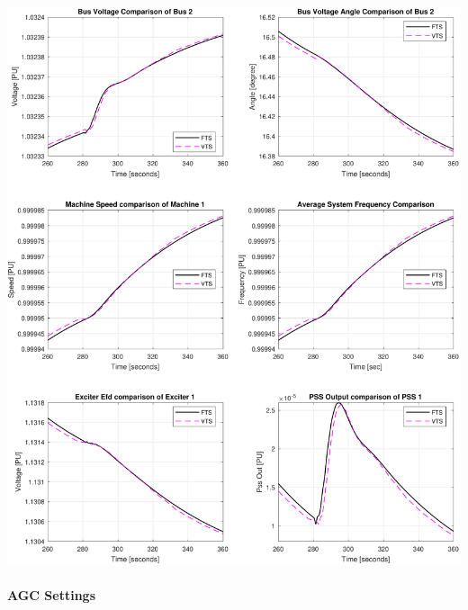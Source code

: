 \documentclass[12pt]{article}
\begin{document}
\includegraphics[width=\linewidth]{MWdetailComp2}
\pagebreak
\paragraph{AGC Settings} \ \\
\vspace{-2em}
\end{document}
